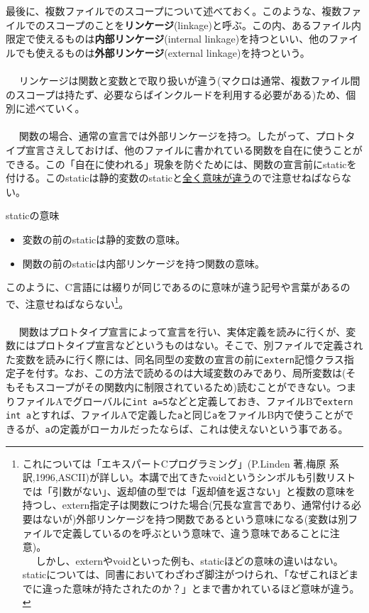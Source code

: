最後に、複数ファイルでのスコープについて述べておく。このような、複数ファイルでのスコープのことを\textbf{リンケージ}(linkage)と呼ぶ。この内、あるファイル内限定で使えるものは\textbf{内部リンケージ}(internal linkage)を持つといい、他のファイルでも使えるものは\textbf{外部リンケージ}(external linkage)を持つという。
\\ \\　
リンケージは関数と変数とで取り扱いが違う(マクロは通常、複数ファイル間のスコープは持たず、必要ならばインクルードを利用する必要がある)ため、個別に述べていく。
\\ \\　
関数の場合、通常の宣言では外部リンケージを持つ。したがって、プロトタイプ宣言さえしておけば、他のファイルに書かれている関数を自在に使うことができる。この「自在に使われる」現象を防ぐためには、関数の宣言前にstaticを付ける。このstaticは静的変数のstaticと\underline{全く意味が違う}ので注意せねばならない。
\begin{itembox}[l]{staticの意味}
\begin{itemize}
\item 変数の前のstaticは静的変数の意味。
\item 関数の前のstaticは内部リンケージを持つ関数の意味。
\end{itemize}
\end{itembox}

このように、C言語には綴りが同じであるのに意味が違う記号や言葉があるので、注意せねばならない\footnote{これについては「エキスパートCプログラミング」(P.Linden 著,梅原 系 訳,1996,ASCII)が詳しい。本講で出てきたvoidというシンボルも引数リストでは「引数がない」、返却値の型では「返却値を返さない」と複数の意味を持つし、extern指定子は関数につけた場合(冗長な宣言であり、通常付ける必要はないが)外部リンケージを持つ関数であるという意味になる(変数は別ファイルで定義しているのを呼ぶという意味で、違う意味であることに注意)。\\　
しかし、externやvoidといった例も、staticほどの意味の違いはない。staticについては、同書においてわざわざ脚注がつけられ、「なぜこれほどまでに違った意味が持たされたのか？」とまで書かれているほど意味が違う。}。
\\ \\　
関数はプロトタイプ宣言によって宣言を行い、実体定義を読みに行くが、変数にはプロトタイプ宣言などというものはない。そこで、別ファイルで定義された変数を読みに行く際には、同名同型の変数の宣言の前に\verb|extern|記憶クラス指定子を付す。なお、この方法で読めるのは大域変数のみであり、局所変数は(そもそもスコープがその関数内に制限されているため)読むことができない。つまりファイルAでグローバルに\verb|int a=5|などと定義しておき、ファイルBで\verb|extern int a|とすれば、ファイルAで定義した\verb|a|と同じ\verb|a|をファイルB内で使うことができるが、\verb|a|の定義がローカルだったならば、これは使えないという事である。

